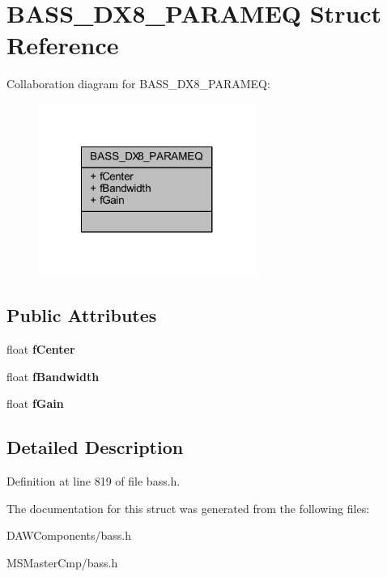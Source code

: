 \hypertarget{struct_b_a_s_s___d_x8___p_a_r_a_m_e_q}{\section{B\-A\-S\-S\-\_\-\-D\-X8\-\_\-\-P\-A\-R\-A\-M\-E\-Q Struct Reference}
\label{struct_b_a_s_s___d_x8___p_a_r_a_m_e_q}
}


Collaboration diagram for B\-A\-S\-S\-\_\-\-D\-X8\-\_\-\-P\-A\-R\-A\-M\-E\-Q\-:\nopagebreak
\begin{figure}[H]
\begin{center}
\leavevmode
\includegraphics[width=200pt]{struct_b_a_s_s___d_x8___p_a_r_a_m_e_q__coll__graph}
\end{center}
\end{figure}
\subsection*{Public Attributes}
\begin{DoxyCompactItemize}
\item 
\hypertarget{struct_b_a_s_s___d_x8___p_a_r_a_m_e_q_ab0774aabf58f7e8eb28213a710713c4e_ab0774aabf58f7e8eb28213a710713c4e}{float {\bfseries f\-Center}}\label{struct_b_a_s_s___d_x8___p_a_r_a_m_e_q_ab0774aabf58f7e8eb28213a710713c4e_ab0774aabf58f7e8eb28213a710713c4e}

\item 
\hypertarget{struct_b_a_s_s___d_x8___p_a_r_a_m_e_q_a93e4f82cbba760d52f2f3b0703c36b8b_a93e4f82cbba760d52f2f3b0703c36b8b}{float {\bfseries f\-Bandwidth}}\label{struct_b_a_s_s___d_x8___p_a_r_a_m_e_q_a93e4f82cbba760d52f2f3b0703c36b8b_a93e4f82cbba760d52f2f3b0703c36b8b}

\item 
\hypertarget{struct_b_a_s_s___d_x8___p_a_r_a_m_e_q_ab573fd8cee48cc9ce5d0c2264bc0394d_ab573fd8cee48cc9ce5d0c2264bc0394d}{float {\bfseries f\-Gain}}\label{struct_b_a_s_s___d_x8___p_a_r_a_m_e_q_ab573fd8cee48cc9ce5d0c2264bc0394d_ab573fd8cee48cc9ce5d0c2264bc0394d}

\end{DoxyCompactItemize}


\subsection{Detailed Description}


Definition at line 819 of file bass.\-h.



The documentation for this struct was generated from the following files\-:\begin{DoxyCompactItemize}
\item 
D\-A\-W\-Components/bass.\-h\item 
M\-S\-Master\-Cmp/bass.\-h\end{DoxyCompactItemize}
